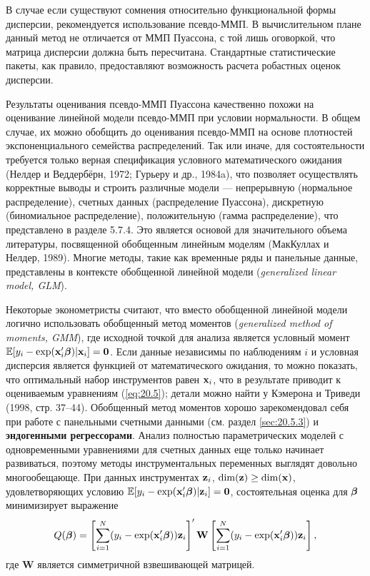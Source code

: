 В случае если существуют сомнения относительно функциональной формы дисперсии, рекомендуется использование псевдо-ММП. В вычислительном плане данный метод не отличается от ММП Пуассона, с той лишь оговоркой, что матрица дисперсии должна быть пересчитана. Стандартные статистические пакеты, как правило, предоставляют возможность расчета робастных оценок дисперсии.

Результаты оценивания псевдо-ММП Пуассона качественно похожи на оценивание линейной модели псевдо-ММП при условии нормальности. В общем случае, их можно обобщить до оценивания псевдо-ММП на основе плотностей экспоненциального семейства распределений. Так или иначе, для состоятельности требуется только верная спецификация условного математического ожидания (Нелдер и Веддербёрн, 1972; Гурьеру и др., 1984a), что позволяет осуществлять корректные выводы и строить различные модели --- непрерывную (нормальное распределение), счетных данных (распределение Пуассона), дискретную (биномиальное распределение), положительную (гамма распределение), что представлено в разделе 5.7.4. Это является основой для значительного объема литературы, посвященной обобщенным линейным моделям (МакКуллах и Нелдер, 1989). Многие методы, такие как временные ряды и панельные данные, представлены в контексте обобщенной линейной модели (\textit{generalized linear model, GLM}).

Некоторые эконометристы считают, что вместо обобщенной линейной модели логично использовать обобщенный метод моментов (\textit{generalized method of moments, GMM}), где исходной точкой для анализа является условный момент $\mathbb{E}[y_i - \exp(\mathbf{x}_i'\bm{\beta})|\mathbf{x}_i] = \mathbf{0}$. Если данные независимы по наблюдениям $i$ и условная дисперсия является функцией от математического ожидания, то можно показать, что оптимальный набор инструментов равен $\mathbf{x}_i$, что в результате приводит к оцениваемым уравнениям (\ref{eq:20.5}); детали можно найти у Кэмерона и Триведи (1998, стр. 37--44). Обобщенный метод моментов хорошо зарекомендовал себя при работе с панельными счетными данными (см. раздел \ref{sec:20.5.3}) и \textbf{эндогенными регрессорами}. Анализ полностью параметрических моделей с одновременными уравнениями для счетных данных еще только начинает развиваться, поэтому методы инструментальных переменных выглядят довольно многообещающе. При данных инструментах $\mathbf{z}_i$, $\dim (\mathbf{z}) \ge \dim(\mathbf{x})$, удовлетворяющих условию $\mathbb{E}[y_i - \exp(\mathbf{x}_i'\bm{\beta})|\mathbf{z}_i] = \mathbf{0}$, состоятельная оценка для $\bm{\beta}$ минимизирует выражение
    \begin{align}\label{eq:20.20}
    Q(\bm{\beta}) = \left[ \sum^{N}_{i = 1} (y_i - \exp(\mathbf{x}_i'\bm{\beta}))\mathbf{z}_i\right]' \mathbf{W} \left[ \sum^{N}_{i = 1} (y_i - \exp(\mathbf{x}_i'\bm{\beta}))\mathbf{z}_i\right],
    \end{align}
где $\mathbf{W}$ является симметричной взвешивающей матрицей.

